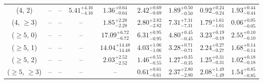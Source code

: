 \begin{table}[h!]
{\begin{tabular}{ccccccccc}
	(4, 2) & -- & -- & $5.41^{+ 4.16 }_{- 4.16 }$ & $1.36^{+ 0.64 }_{- 0.64 }$ & $2.42^{+ 0.69 }_{- 0.69 }$ & $1.89^{+ 0.50 }_{- 0.50 }$ & $0.92^{+ 0.24 }_{- 0.24 }$ & $1.93^{+ 0.44 }_{- 0.44 }$ \\[0.5ex] 
	(4, $\ge3$) & -- & -- & -- & $1.85^{+ 2.28 }_{- 2.28 }$ & $2.80^{+ 2.82 }_{- 2.82 }$ & $7.31^{+ 7.31 }_{- 7.31 }$ & $1.79^{+ 1.61 }_{- 1.61 }$ & $0.06^{+ 0.05 }_{- 0.05 }$ \\[0.5ex] 
	($\ge5$, 0) & -- & -- & -- & $17.09^{+ 6.72 }_{- 6.72 }$ & $6.31^{+ 0.95 }_{- 0.95 }$ & $4.80^{+ 0.45 }_{- 0.45 }$ & $3.23^{+ 0.19 }_{- 0.19 }$ & $2.55^{+ 0.10 }_{- 0.10 }$ \\[0.5ex] 
	($\ge5$, 1) & -- & -- & -- & $14.04^{+ 14.48 }_{- 14.48 }$ & $4.03^{+ 1.06 }_{- 1.06 }$ & $3.28^{+ 0.71 }_{- 0.71 }$ & $2.24^{+ 0.27 }_{- 0.27 }$ & $1.68^{+ 0.14 }_{- 0.14 }$ \\[0.5ex] 
	($\ge5$, 2) & -- & -- & -- & $2.03^{+ 2.52 }_{- 2.52 }$ & $1.46^{+ 0.55 }_{- 0.55 }$ & $1.27^{+ 0.35 }_{- 0.35 }$ & $1.25^{+ 0.31 }_{- 0.31 }$ & $1.02^{+ 0.18 }_{- 0.18 }$ \\[0.5ex] 
	($\ge5$, $\ge3$) & -- & -- & -- & -- & $0.61^{+ 0.61 }_{- 0.61 }$ & $2.37^{+ 2.80 }_{- 2.80 }$ & $2.08^{+ 1.49 }_{- 1.49 }$ & $1.54^{+ 0.85 }_{- 0.85 }$ \\[0.5ex] 
	\hline
	\hline
\end{tabular}}
\end{table}
